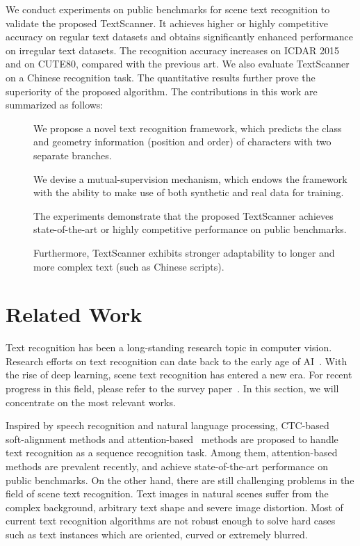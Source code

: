 \documentclass[letterpaper]{article} \usepackage{aaai20}  \usepackage{times}  \usepackage{helvet} \usepackage{courier}  \usepackage[hyphens]{url}  \usepackage{graphicx} \urlstyle{rm} \def\UrlFont{\rm}  \usepackage{graphicx}  \frenchspacing  \setlength{\pdfpagewidth}{8.5in}  \setlength{\pdfpageheight}{11in}
\begin{document}
We conduct experiments on public benchmarks for scene text recognition to validate the proposed TextScanner. It achieves higher or highly competitive accuracy on regular text datasets and obtains significantly enhanced performance on irregular text datasets. The recognition accuracy increases  on ICDAR 2015 and  on CUTE80, compared with the previous art. We also evaluate TextScanner on a Chinese recognition task. The quantitative results further prove the superiority of the proposed algorithm. The contributions in this work are summarized as follows:
\begin{description}
\item[] We propose a novel text recognition framework, which predicts the class and geometry information (position and order) of characters with two separate branches.
\item[] We devise a mutual-supervision mechanism, which endows the framework with the ability to make use of both synthetic and real data for training.
\item[] The experiments demonstrate that the proposed TextScanner achieves state-of-the-art or highly competitive performance on public benchmarks.
\item[] Furthermore, TextScanner exhibits stronger adaptability to longer and more complex text (such as Chinese scripts).
\end{description}


\section{Related Work}

Text recognition has been a long-standing research topic in computer vision. Research efforts on text recognition can date back to the early age of AI~\cite{herbert1982history,lecun1998gradient}. With the rise of deep learning, scene text recognition has entered a new era. For recent progress in this field, please refer to the survey paper~\cite{long2018scene,zhu2016scene}. In this section, we will concentrate on the most relevant works.

Inspired by speech recognition and natural language processing, CTC-based~\cite{shi2017end,ctc} soft-alignment methods and attention-based~\cite{visual_attn,aster} methods are proposed to handle text recognition as a sequence recognition task. Among them, attention-based methods are prevalent recently, and achieve state-of-the-art performance on public benchmarks. On the other hand, there are still challenging problems in the field of scene text recognition. Text images in natural scenes suffer from the complex background, arbitrary text shape and severe image distortion. Most of current text recognition algorithms are not robust enough to solve hard cases such as text instances which are oriented, curved or extremely blurred.
\end{document}

